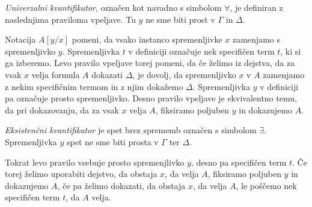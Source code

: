 \begin{definicija}
	\emph{Univerzalni kvantifikator}, označen kot navadno s simbolom $\forall$, je definiran z naslednjima praviloma vpeljave. Tu $y$ ne sme biti prost v $\Gamma$ in $\Delta$.
	\begin{center}
        \begin{bprooftree}
        \end{bprooftree}
        \begin{bprooftree}
        \end{bprooftree}
	\end{center}
	Notacija $A[y/x]$ pomeni, da vsako instanco spremenljivke $x$ zamenjamo s spremenljivko $y$. Spremenljivka $t$ v definiciji označuje nek specifičen term $t$, ki si ga izberemo. Levo pravilo vpeljave torej pomeni, da če želimo iz dejstva, da za vsak $x$ velja formula $A$ dokazati $\Delta$, je dovolj, da spremenljivko $x$ v $A$ zamenjamo z nekim specifičnim termom in z njim dokažemo $\Delta$. Spremenljivka $y$ v definiciji pa označuje prosto spremenljivko. Desno pravilo vpeljave je ekvivalentno temu, da pri dokazovanju, da za vsak $x$ velja $A$, fiksiramo poljuben $y$ in dokazujemo $A$.
\end{definicija}

\begin{definicija}
    \emph{Eksistenčni kvantifikator} je spet brez sprememb označen s simbolom $\exists$. Spremenljivka $y$ spet ne sme  biti prosta v $\Gamma$ ter $\Delta$.
    \begin{center}
        \begin{bprooftree}
        \end{bprooftree}
        \begin{bprooftree}
        \end{bprooftree}
	\end{center}
	Tokrat levo pravilo vsebuje prosto spremenjlivko $y$, desno pa specifičen term $t$. Če torej želimo uporabiti dejstvo, da obstaja $x$, da velja $A$, fiksiramo poljuben $y$ in dokazujemo $A$, če pa želimo dokazati, da obstaja $x$, da velja $A$, le poščemo nek specifičen term $t$, da $A$ velja.
\end{definicija}

